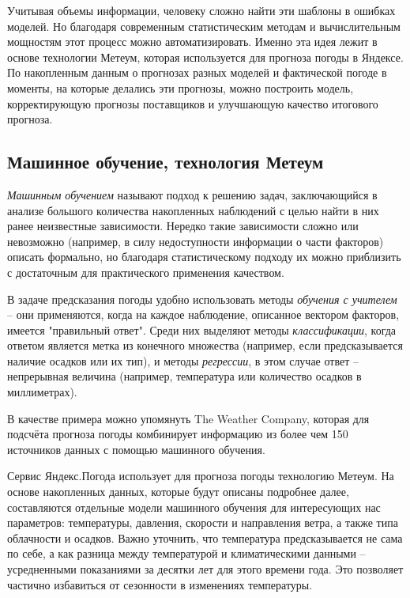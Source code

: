 \documentclass[14pt]{matmex-diploma}
\begin{document}
Учитывая объемы информации, человеку сложно найти эти шаблоны в ошибках моделей. Но благодаря современным статистическим методам и вычислительным мощностям этот процесс можно автоматизировать. Именно эта идея лежит в основе технологии Метеум, которая используется для прогноза погоды в Яндексе. По накопленным данным о прогнозах разных моделей и фактической погоде в моменты, на которые делались эти прогнозы, можно построить модель, корректирующую прогнозы поставщиков и улучшающую качество итогового прогноза.


\subsection{Машинное обучение, технология Метеум}

\textit{Машинным обучением} называют подход к решению задач, заключающийся в анализе большого количества накопленных наблюдений с целью найти в них ранее неизвестные зависимости. Нередко такие зависимости сложно или невозможно (например, в силу недоступности информации о части факторов) описать формально, но благодаря статистическому подходу их можно приблизить с достаточным для практического применения качеством\cite{bishop}.

В задаче предсказания погоды удобно использовать методы \textit{обучения с учителем} -- они применяются, когда на каждое наблюдение, описанное вектором факторов, имеется "правильный ответ". Среди них выделяют методы \textit{классификации}, когда ответом является метка из конечного множества (например, если предсказывается наличие осадков или их тип), и методы \textit{регрессии}, в этом случае ответ -- непрерывная величина (например, температура или количество осадков в миллиметрах).

В качестве примера можно упомянуть The Weather Company, которая для подсчёта прогноза погоды комбинирует информацию из более чем 150 источников данных с помощью машинного обучения\cite{ibm_weather}.

Сервис Яндекс.Погода использует для прогноза погоды технологию Метеум. На основе накопленных данных, которые будут описаны подробнее далее, составляются отдельные модели машинного обучения для интересующих нас параметров: температуры, давления, скорости и направления ветра, а также типа облачности и осадков. Важно уточнить, что температура предсказывается не сама по себе, а как разница между температурой и климатическими данными -- усредненными показаниями за десятки лет для этого времени года. Это позволяет частично избавиться от сезонности в изменениях температуры.
\end{document}
